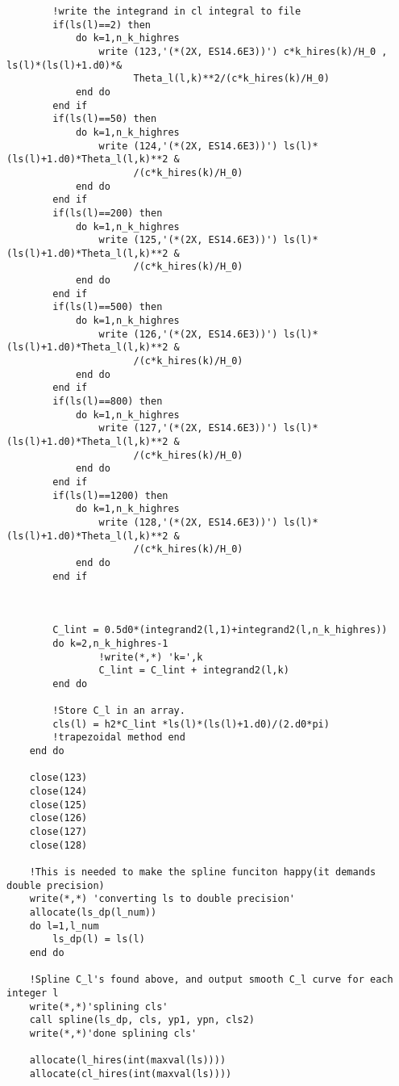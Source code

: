 \documentclass[a4paper]{report}
\begin{document}
\begin{verbatim}
        !write the integrand in cl integral to file
        if(ls(l)==2) then
            do k=1,n_k_highres
                write (123,'(*(2X, ES14.6E3))') c*k_hires(k)/H_0 , ls(l)*(ls(l)+1.d0)*&
                      Theta_l(l,k)**2/(c*k_hires(k)/H_0)
            end do
        end if 
        if(ls(l)==50) then
            do k=1,n_k_highres
                write (124,'(*(2X, ES14.6E3))') ls(l)*(ls(l)+1.d0)*Theta_l(l,k)**2 &
                      /(c*k_hires(k)/H_0)
            end do
        end if 
        if(ls(l)==200) then
            do k=1,n_k_highres
                write (125,'(*(2X, ES14.6E3))') ls(l)*(ls(l)+1.d0)*Theta_l(l,k)**2 &
                      /(c*k_hires(k)/H_0)
            end do
        end if 
        if(ls(l)==500) then
            do k=1,n_k_highres
                write (126,'(*(2X, ES14.6E3))') ls(l)*(ls(l)+1.d0)*Theta_l(l,k)**2 &
                      /(c*k_hires(k)/H_0)
            end do
        end if 
        if(ls(l)==800) then
            do k=1,n_k_highres
                write (127,'(*(2X, ES14.6E3))') ls(l)*(ls(l)+1.d0)*Theta_l(l,k)**2 &
                      /(c*k_hires(k)/H_0)
            end do
        end if 
        if(ls(l)==1200) then
            do k=1,n_k_highres
                write (128,'(*(2X, ES14.6E3))') ls(l)*(ls(l)+1.d0)*Theta_l(l,k)**2 &
                      /(c*k_hires(k)/H_0)
            end do
        end if 



        C_lint = 0.5d0*(integrand2(l,1)+integrand2(l,n_k_highres))
        do k=2,n_k_highres-1
                !write(*,*) 'k=',k
                C_lint = C_lint + integrand2(l,k)
        end do

        !Store C_l in an array.
        cls(l) = h2*C_lint *ls(l)*(ls(l)+1.d0)/(2.d0*pi)
        !trapezoidal method end
    end do

    close(123)
    close(124)
    close(125)
    close(126)
    close(127)
    close(128)

    !This is needed to make the spline funciton happy(it demands double precision)
    write(*,*) 'converting ls to double precision'
    allocate(ls_dp(l_num))
    do l=1,l_num
        ls_dp(l) = ls(l)
    end do

    !Spline C_l's found above, and output smooth C_l curve for each integer l
    write(*,*)'splining cls'
    call spline(ls_dp, cls, yp1, ypn, cls2)
    write(*,*)'done splining cls'

    allocate(l_hires(int(maxval(ls))))
    allocate(cl_hires(int(maxval(ls))))


\end{verbatim}
\end{document}
